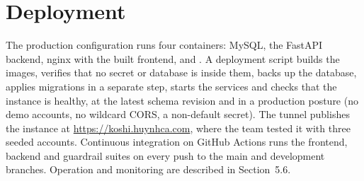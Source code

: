 \documentclass[../main.tex]{subfiles}
\begin{document}
\section{Deployment}
The production configuration runs four containers: MySQL, the FastAPI backend, nginx with the
built frontend, and . A deployment script builds the images, verifies that no
secret or database is inside them, backs up the database, applies migrations in a separate step,
starts the services and checks that the instance is healthy, at the latest schema revision and in
a production posture (no demo accounts, no wildcard CORS, a non-default secret). The tunnel
publishes the instance at \url{https://koshi.huynhca.com}, where the team tested it with three
seeded accounts. Continuous integration on GitHub Actions runs the frontend, backend and guardrail suites on every push to the main and development branches. Operation and monitoring are described in Section~5.6.
\end{document}
